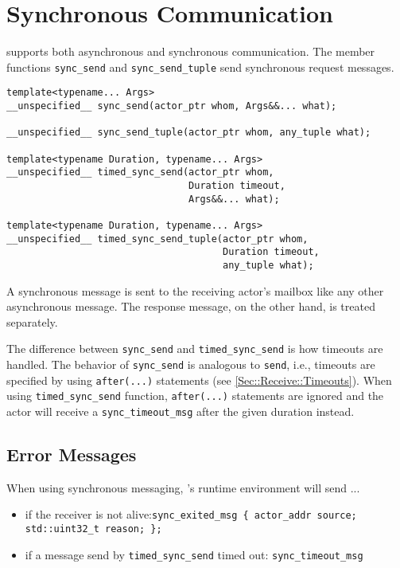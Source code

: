 \section{Synchronous Communication}
\label{Sec::Sync}

\libcppa supports both asynchronous and synchronous communication.
The member functions \lstinline^sync_send^ and \lstinline^sync_send_tuple^ send synchronous request messages.

\begin{lstlisting}
template<typename... Args>
__unspecified__ sync_send(actor_ptr whom, Args&&... what);

__unspecified__ sync_send_tuple(actor_ptr whom, any_tuple what);

template<typename Duration, typename... Args>
__unspecified__ timed_sync_send(actor_ptr whom,
                                Duration timeout,
                                Args&&... what);

template<typename Duration, typename... Args>
__unspecified__ timed_sync_send_tuple(actor_ptr whom,
                                      Duration timeout,
                                      any_tuple what);
\end{lstlisting}

A synchronous message is sent to the receiving actor's mailbox like any other asynchronous message.
The response message, on the other hand, is treated separately.

The difference between \lstinline^sync_send^ and \lstinline^timed_sync_send^ is how timeouts are handled.
The behavior of \lstinline^sync_send^ is analogous to \lstinline^send^, i.e., timeouts are specified by using \lstinline^after(...)^ statements (see \ref{Sec::Receive::Timeouts}).
When using \lstinline^timed_sync_send^ function, \lstinline^after(...)^ statements are ignored and the actor will receive a \lstinline^sync_timeout_msg^ after the given duration instead.

\subsection{Error Messages}

When using synchronous messaging, \libcppa's runtime environment will send ...

\begin{itemize}
\item if the receiver is not alive:\newline\lstinline^sync_exited_msg { actor_addr source; std::uint32_t reason; };^
\item if a message send by \lstinline^timed_sync_send^ timed out: \lstinline^sync_timeout_msg^
\end{itemize}

